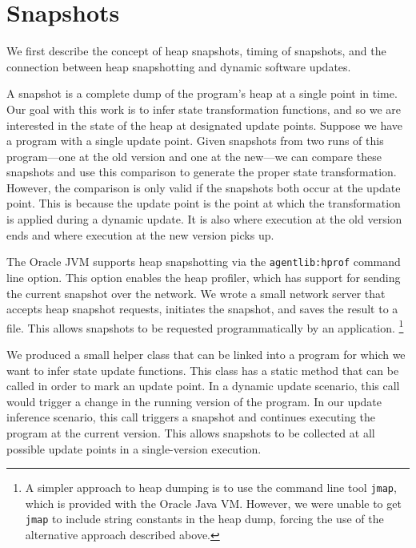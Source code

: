 
\section{Snapshots}


We first describe the concept of heap snapshots, timing of snapshots, and the connection between heap snapshotting and dynamic software updates.

A snapshot is a complete dump of the program's heap at a single point in time.  Our goal with this work is to infer state transformation functions, and so we are interested in the state of the heap at designated update points.  Suppose we have a program with a single update point.  Given snapshots from two runs of this program---one at the old version and one at the new---we can compare these snapshots and use this comparison to generate the proper state transformation.  However, the comparison is only valid if the snapshots both occur at the update point.  This is because the update point is the point at which the transformation is applied during a dynamic update.  It is also where execution at the old version ends and where execution at the new version picks up.

The Oracle JVM supports heap snapshotting via the \texttt{agentlib:hprof} command line option.  This option enables the heap profiler, which has support for sending the current snapshot over the network.  We wrote a small network server that accepts heap snapshot requests, initiates the snapshot, and saves the result to a file.  This allows snapshots to be requested programmatically by an application.
\footnote{A simpler approach to heap dumping is to use the command line tool \texttt{jmap}, which is provided with the Oracle Java VM.  However, we were unable to get \texttt{jmap} to include string constants in the heap dump, forcing the use of the alternative approach described above.}

We produced a small helper class that can be linked into a program for which we want to infer state update functions.  This class has a static method that can be called in order to mark an update point.  In a dynamic update scenario, this call would trigger a change in the running version of the program.  In our update inference scenario, this call triggers a snapshot and continues executing the program at the current version.  This allows snapshots to be collected at all possible update points in a single-version execution.

